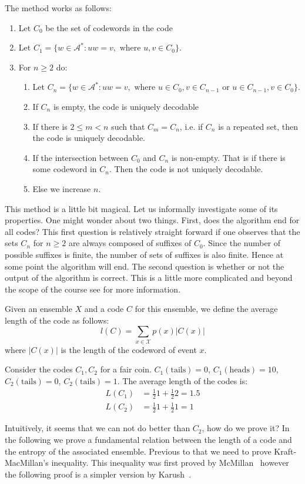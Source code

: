The method works as follows:
\begin{enumerate}
\item Let $C_0$ be the set of codewords in the code
\item Let $C_1=\{w\in\mathcal A^*:uw=v,\text{ where }u,v\in C_0\}$.
\item For $n\geq 2$ do:
\begin{enumerate}
\item Let $C_n=\{w\in\mathcal A^*:uw=v,\text{ where }u\in C_0,v\in C_{n-1}\text{ or }u\in C_{n-1},v\in C_0\}$.
\item If $C_n$ is empty, the code is uniquely decodable
\item If there is $2\leq m<n$ such that $C_m=C_n$, i.e. if $C_n$ is a repeated set, then the code is uniquely decodable.
\item If the intersection between $C_0$ and $C_n$ is non-empty. That is if there is some codeword in $C_n$. Then the code is not uniquely decodable.
\item Else we increase $n$.
\end{enumerate}
\end{enumerate}

This method is a little bit magical. Let us informally investigate some of its properties. One might wonder about two things. First, does the algorithm end for all codes? This first question is relatively straight forward if one observes that the sets $C_n$ for $n\geq 2$ are always composed of suffixes of $C_0$. Since the number of possible suffixes is finite, the number of sets of suffixes is also finite. Hence at some point the algorithm will end. The second question is whether or not the output of the algorithm is correct. This is a little more complicated and beyond the scope of the course see \cite{Salomon2010} for more information.

\begin{definition}
Given an ensemble $X$ and a code $C$ for this ensemble, we define the average length of the code as follows:
\begin{equation}
l(C)=\sum_{x\in\mathcal X}p(x)|C(x)|
\end{equation}
where $|C(x)|$ is the length of the codeword of event $x$.
\end{definition}
\begin{example}
Consider the codes $C_1,C_2$ for a fair coin. $C_1(\text{tails})=0$,  $C_1(\text{heads})=10$, $C_2(\text{tails})=0$, $C_2(\text{tails})=1$. The average length of the codes is:
\begin{align}
L(C_1)&=\frac{1}{2}1+\frac{1}{2}2=1.5\\
L(C_2)&=\frac{1}{2}1+\frac{1}{2}1=1
\end{align}
\end{example}
Intuitively, it seems that we can not do better than $C_2$, how do we prove it? In the following we prove a fundamental relation between the length of a code and the entropy of the associated ensemble. Previous to that we need to prove Kraft-MacMillan's inequality. This  inequality was first proved by McMillan~\cite{McMillan_56} however the following proof is a simpler version by Karush~\cite{Karush_61,Cover_91}.

